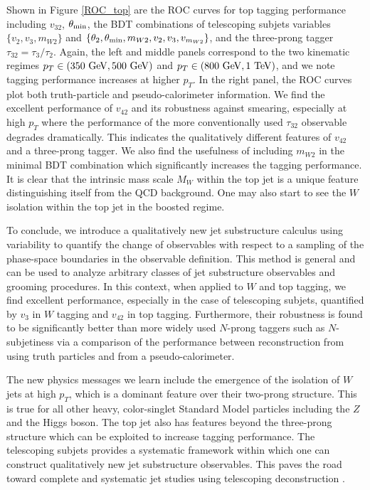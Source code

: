\documentclass[aps,prl,floatfix,preprintnumbers,twocolumn,groupedaddress,nofootinbib]{revtex4-1}
\begin{document}
Shown in Figure \ref{ROC_top} are the ROC curves for top tagging performance including $v_{32}$, $\theta_{\rm min}$, the BDT combinations of telescoping subjets variables $\{v_2, v_3, m_{W2}\}$ and $\{\theta_2,\theta_{\rm min},m_{W2},v_2,v_3,v_{m_{W2}}\}$, and the three-prong tagger $\tau_{32}=\tau_{3}/\tau_{2}$. Again, the left and middle panels correspond to the two kinematic regimes $p_T \in (350~{\rm GeV}, 500~{\rm GeV})$ and $p_T \in (800~{\rm GeV}, 1~{\rm TeV})$, and we note tagging performance increases at higher $p_T$. In the right panel, the ROC curves plot both truth-particle and pseudo-calorimeter information. We find the excellent performance of $v_{42}$ and its robustness against smearing, especially at high $p_T$ where the performance of the more conventionally used $\tau_{32}$ observable degrades dramatically. This indicates the qualitatively different features of $v_{42}$ and a three-prong tagger. We also find the usefulness of including $m_{W2}$ in the minimal BDT combination which significantly increases the tagging performance. It is clear that the intrinsic mass scale $M_W$ within the top jet is a unique feature distinguishing itself from the QCD background. One may also start to see the $W$ isolation within the top jet in the boosted regime.

To conclude, we introduce a qualitatively new jet substructure calculus using variability to quantify the change of observables with respect to a sampling of the phase-space boundaries in the observable definition. This method is general and can be used to analyze arbitrary classes of jet substructure observables and grooming procedures. In this context, when applied to $W$ and top tagging, we find excellent performance, especially in the case of telescoping subjets, quantified by $v_3$ in $W$ tagging and $v_{42}$ in top tagging. Furthermore, their robustness is found to be significantly better than more widely used $N$-prong taggers such as $N$-subjetiness via a comparison of the performance between reconstruction from using truth particles and from a pseudo-calorimeter.

The new physics messages we learn include the emergence of the isolation of $W$ jets at high $p_T$, which is a dominant feature over their two-prong structure. This is true for all other heavy, color-singlet Standard Model particles including the $Z$ and the Higgs boson. The top jet also has features beyond the three-prong structure which can be exploited to increase tagging performance. The telescoping subjets provides a systematic framework within which one can construct qualitatively new jet substructure observables. This paves the road toward complete and systematic jet studies using telescoping deconstruction \cite{Chien:2017decon}.
\end{document}
